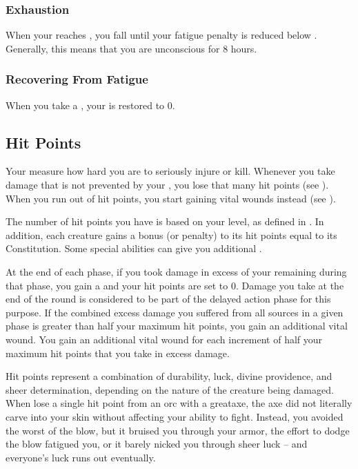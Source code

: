         \subsubsection{Exhaustion}\label{Exhaustion}
            When your  reaches , you fall \unconscious until your fatigue penalty is reduced below .
            Generally, this means that you are unconscious for 8 hours.

        \subsubsection{Recovering From Fatigue}
            When you take a , your  is restored to 0.

    \subsection{Hit Points}\label{Hit Points}
        Your  measure how hard you are to seriously injure or kill.
        Whenever you take damage that is not prevented by your , you lose that many hit points (see ).
        When you run out of hit points, you start gaining vital wounds instead (see ).

        The number of hit points you have is based on your level, as defined in .
        In addition, each creature gains a bonus (or penalty) to its hit points equal to its Constitution.
        Some special abilities can give you additional .

        \label{Reaching Zero Hit Points}
        At the end of each phase, if you took damage in excess of your remaining  during that phase, you gain a  and your hit points are set to 0.
        Damage you take at the end of the round is considered to be part of the delayed action phase for this purpose.
        If the combined excess damage you suffered from all sources in a given phase is greater than half your maximum hit points, you gain an additional vital wound.
        You gain an additional vital wound for each increment of half your maximum hit points that you take in excess damage.

         Hit points represent a combination of durability, luck, divine providence, and sheer determination, depending on the nature of the creature being damaged.
        When lose a single hit point from an orc with a greataxe, the axe did not literally carve into your skin without affecting your ability to fight.
        Instead, you avoided the worst of the blow, but it bruised you through your armor, the effort to dodge the blow fatigued you, or it barely nicked you through sheer luck -- and everyone's luck runs out eventually.

